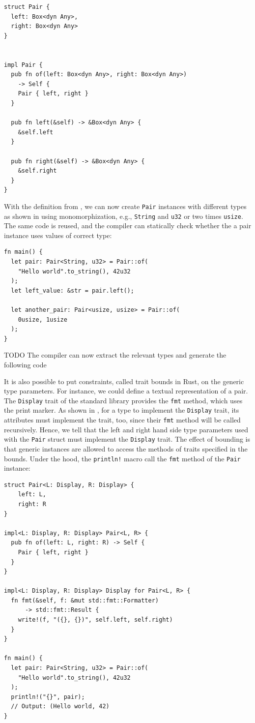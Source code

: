 \documentclass[paper=a4,%
  twoside,%
  BCOR4mm,%
  abstract=true,%
  toc=bibliography,%
  chapterprefix=true,%
  toc=bibliographynumbered,%
  open=right,%
  english,%
  pagesize=pdftex]{scrreprt}
\begin{document}
\begin{lstlisting}[style=boxed, caption=A data type with dynamic dispatch, label=lst:dynamic-dispatch]
struct Pair {
  left: Box<dyn Any>,
  right: Box<dyn Any>
}


impl Pair {
  pub fn of(left: Box<dyn Any>, right: Box<dyn Any>)
    -> Self {
    Pair { left, right }
  }

  pub fn left(&self) -> &Box<dyn Any> {
    &self.left
  }

  pub fn right(&self) -> &Box<dyn Any> {
    &self.right
  }
}
\end{lstlisting}

With the definition from , we can now create \texttt{Pair} instances with different types as shown in  using monomorphization, e.g., \texttt{String} and \texttt{u32} or two times \texttt{usize}. The same code is reused, and the compiler can statically check whether the a pair instance uses values of correct type:
\begin{lstlisting}[style=boxed, caption={}, label=lst:example-generics-usage]
fn main() {
  let pair: Pair<String, u32> = Pair::of(
    "Hello world".to_string(), 42u32
  );
  let left_value: &str = pair.left();

  let another_pair: Pair<usize, usize> = Pair::of(
    0usize, 1usize
  );
}
\end{lstlisting}
TODO The compiler can now extract the relevant types and generate the following code

It is also possible to put constraints, called trait bounds in Rust, on the generic type parameters. For instance, we could define a textual representation of a pair. The \texttt{Display} trait of the standard library provides the \texttt{fmt} method, which uses the \texttt{\string{\string}} print marker. As shown in , for a type to implement the \texttt{Display} trait, its attributes must implement the trait, too, since their \texttt{fmt} method will be called recursively. Hence, we tell that the left and right hand side type parameters used with the \texttt{Pair} struct must implement the \texttt{Display} trait. The effect of bounding is that generic instances are allowed to access the methods of traits specified in the bounds. Under the hood, the \texttt{println!} macro call the \texttt{fmt} method of the \texttt{Pair} instance:
\begin{lstlisting}[style=boxed, caption={}, label=lst:example-trait-bounds]
struct Pair<L: Display, R: Display> {
    left: L,
    right: R
}

impl<L: Display, R: Display> Pair<L, R> {
  pub fn of(left: L, right: R) -> Self {
    Pair { left, right }
  }
}

impl<L: Display, R: Display> Display for Pair<L, R> {
  fn fmt(&self, f: &mut std::fmt::Formatter)
      -> std::fmt::Result {
    write!(f, "({}, {})", self.left, self.right)
  }
}

fn main() {
  let pair: Pair<String, u32> = Pair::of(
    "Hello world".to_string(), 42u32
  );
  println!("{}", pair);
  // Output: (Hello world, 42)
}
\end{lstlisting}
\end{document}
